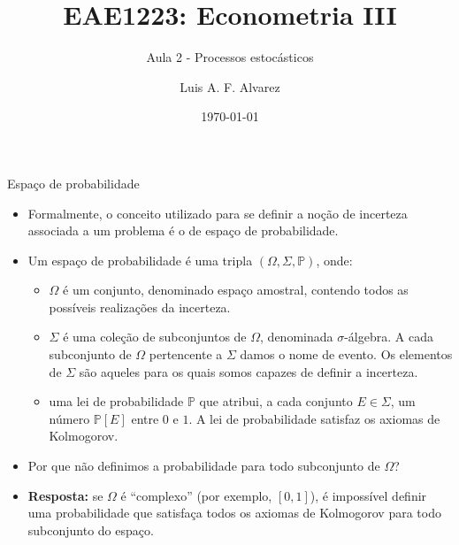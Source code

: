 \documentclass[11pt]{beamer}
\author{Luis A. F. Alvarez}
\title{EAE1223: Econometria III}
\subtitle{Aula 2 - Processos estocásticos}
\date{\today}
\newenvironment{halfwideitemize}{\itemize\addtolength{\itemsep}{0.5em}}{\enditemize}
\begin{document}
	\begin{frame}[plain]
	\maketitle
	\end{frame}
	\begin{frame}{Espaço de probabilidade}
		\begin{itemize}
			\item Formalmente, o conceito utilizado para se definir a noção de incerteza associada a um problema é o de {\color{blue}espaço de probabilidade}.
			\item Um espaço de probabilidade é uma tripla $(\Omega, \Sigma, \mathbb{P})$, onde:
			\begin{itemize}
				\item $\Omega$ é um conjunto, denominado {\color{blue}espaço amostral}, contendo todos as possíveis realizações da incerteza.
				\item $\Sigma$ é uma coleção de subconjuntos de $\Omega$, denominada {\color{blue}$\sigma$-álgebra}. A cada subconjunto de $\Omega$ pertencente a $\Sigma$  damos o nome de {\color{blue}evento}. Os elementos de $\Sigma$ são aqueles para os quais somos capazes de definir a incerteza.
				\item uma {\color{blue}lei de probabilidade} $\mathbb{P}$ que atribui, a cada conjunto $E \in \Sigma$, um número $\mathbb{P}[E]$ entre $0$ e $1$. A lei de probabilidade satisfaz os {\color{blue}axiomas de Kolmogorov}.
			\end{itemize}
			\item Por que não definimos a probabilidade para todo subconjunto de $\Omega$?
			\begin{halfwideitemize}
				\item \textbf{Resposta:} se $\Omega$ é ``complexo'' (por exemplo, $[0,1]$), é impossível definir uma probabilidade que satisfaça todos os axiomas de Kolmogorov para todo subconjunto do espaço.
			\end{halfwideitemize}
		\end{itemize}
	\end{frame}
	
\end{document}
